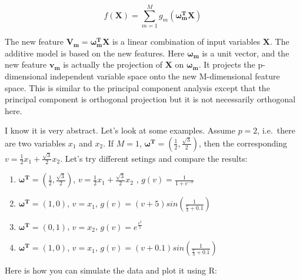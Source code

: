 \documentclass[12pt,]{krantz}
\begin{document}
\[f(\mathbf{X})=\sum_{m=1}^{M}g_{m}(\mathbf{\omega_{m}^{T}X})\]

The new feature \(\mathbf{V_{m}}=\mathbf{\omega_{m}^{T}X}\) is a linear combination of input variables \(\mathbf{X}\). The additive model is based on the new features. Here \(\mathbf{\omega_{m}}\) is a unit vector, and the new feature \(\mathbf{v_m}\) is actually the projection of \(\mathbf{X}\) on \(\mathbf{\omega_{m}}\). It projects the p-dimensional independent variable space onto the new M-dimensional feature space. This is similar to the principal component analysis except that the principal component is orthogonal projection but it is not necessarily orthogonal here.

I know it is very abstract. Let's look at some examples. Assume \(p=2\), i.e.~there are two variables \(x_1\) and \(x_2\). If \(M=1\), \(\mathbf{\omega^{T}}=(\frac{1}{2},\frac{\sqrt{3}}{2})\), then the corresponding \(v=\frac{1}{2}x_{1}+\frac{\sqrt{3}}{2}x_{2}\). Let's try different setings and compare the results:

\begin{enumerate}
\def\labelenumi{\arabic{enumi}.}
\item
  \(\mathbf{\omega^{T}}=(\frac{1}{2},\frac{\sqrt{3}}{2})\), \(v=\frac{1}{2}x_{1}+\frac{\sqrt{3}}{2}x_{2}\) , \(g(v)=\frac{1}{1+e^{-v}}\)
\item
  \(\mathbf{\omega^{T}}=(1,0)\), \(v = x_1\), \(g(v)=(v+5)sin(\frac{1}{\frac{v}{3}+0.1})\)
\item
  \(\mathbf{\omega^{T}}=(0,1)\), \(v = x_2\), \(g(v)=e^{\frac{v^2}{5}}\)
\item
  \(\mathbf{\omega^{T}}=(1,0)\), \(v = x_1\), \(g(v)=(v+0.1)sin(\frac{1}{\frac{v}{3}+0.1})\)
\end{enumerate}

Here is how you can simulate the data and plot it using R:
\end{document}
